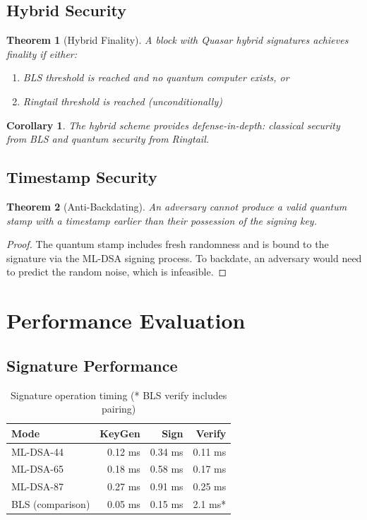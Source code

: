 \documentclass[11pt,a4paper]{article}
\newtheorem{theorem}{Theorem}
\newtheorem{corollary}{Corollary}
\begin{document}
\subsection{Hybrid Security}

\begin{theorem}[Hybrid Finality]
A block with Quasar hybrid signatures achieves finality if either:
\begin{enumerate}
    \item BLS threshold is reached and no quantum computer exists, or
    \item Ringtail threshold is reached (unconditionally)
\end{enumerate}
\end{theorem}

\begin{corollary}
The hybrid scheme provides defense-in-depth: classical security from BLS and quantum security from Ringtail.
\end{corollary}

\subsection{Timestamp Security}

\begin{theorem}[Anti-Backdating]
An adversary cannot produce a valid quantum stamp with a timestamp earlier than their possession of the signing key.
\end{theorem}

\begin{proof}
The quantum stamp includes fresh randomness and is bound to the signature via the ML-DSA signing process. To backdate, an adversary would need to predict the random noise, which is infeasible.
\end{proof}

\section{Performance Evaluation}

\subsection{Signature Performance}

\begin{table}[h]
\centering
\begin{tabular}{lrrr}
\toprule
\textbf{Mode} & \textbf{KeyGen} & \textbf{Sign} & \textbf{Verify} \\
\midrule
ML-DSA-44 & 0.12 ms & 0.34 ms & 0.11 ms \\
ML-DSA-65 & 0.18 ms & 0.58 ms & 0.17 ms \\
ML-DSA-87 & 0.27 ms & 0.91 ms & 0.25 ms \\
BLS (comparison) & 0.05 ms & 0.15 ms & 2.1 ms* \\
\bottomrule
\end{tabular}
\caption{Signature operation timing (* BLS verify includes pairing)}
\end{table}
\end{document}
